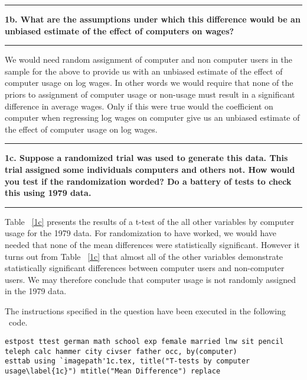 \documentclass[12pt]{article}
\newcommand\question[1]{\vspace{1em}\hrule\vspace{1em}\textbf{#1}\vspace{1em}\hrule\vspace{1em}}
\begin{document}

\begin{table}
\caption{}

\end{table}

\newpage
\question{1b. What are the assumptions under which this difference would be an unbiased estimate of the effect of computers on wages?}
We would need random assignment of computer and non computer users in the sample for the above to provide us with an unbiased estimate of the effect of computer usage on log wages. In other words we would require that none of the priors to assignment of computer usage or non-usage must result in a significant difference in average wages. Only if this were true would the coefficient on computer when regressing log wages on computer give us an unbiased estimate of the effect of computer usage on log wages.

\question{1c. Suppose a randomized trial was used to generate this data. This trial assigned some individuals computers and others not. How would you test if the randomization worded? Do a battery of tests to check this using 1979 data.}
Table ~\ref{1c} presents the results of a t-test of the all other variables by computer usage for the 1979 data. For randomization to have worked, we would have needed that none of the mean differences were statistically significant. However it turns out from Table ~\ref{1c} that almost all of the other variables demonstrate statistically significant differences between computer users and non-computer users. We may therefore conclude that computer usage is not randomly assigned in the 1979 data.

The instructions specified in the question have been executed in the following \stata \  code.\\
\begin{lstlisting}
estpost ttest german math school exp female married lnw sit pencil teleph calc hammer city civser father occ, by(computer)
esttab using `imagepath'1c.tex, title("T-tests by computer usage\label{1c}") mtitle("Mean Difference") replace
\end{lstlisting}


\end{document}
